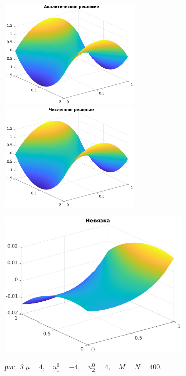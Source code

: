 \documentclass[11pt]{article}
\begin{document}
\newpage
\noindent
\includegraphics[width=0.51\textwidth]{sol_a_3.eps}
\includegraphics[width=0.51\textwidth]{sol_n_3.eps}
\begin{center}
\includegraphics[width=0.7\textwidth]{resid3.eps}

\it{рис. 3 \quad $\mu = 4, \quad u_1^0 = -4, \quad u_2^0 = 4, \quad M = N = 400.$}
\end{center}
\end{document}
